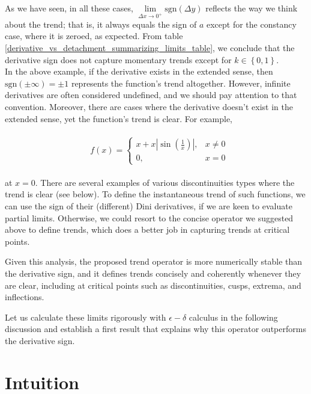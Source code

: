 \documentclass[11pt]{book}
\begin{document}
As we have seen, in all these cases, $\underset{\Delta x\rightarrow0^{+}}{\lim}\text{sgn}\left(\Delta y\right)$ reflects the way we think about the trend; that is, it always equals the sign of $a$ except for the constancy case, where it is zeroed, as expected. From table \ref{derivative_vs_detachment_summarizing_limits_table}, we conclude that the derivative sign does not capture momentary trends except for $k\in \left\{0,1\right\}$. \\

In the above example, if the derivative exists in the extended sense, then $\text{sgn}\left(\pm \infty\right) = \pm 1$ represents the function’s trend altogether. However, infinite derivatives are often considered undefined, and we should pay attention to that convention. Moreover, there are cases where the derivative doesn’t exist in the extended sense, yet the function’s trend is clear. For example,

\begin{align}
&\begin{aligned} f\left(x\right)=\begin{cases}
x+x\left|\sin\left(\frac{1}{x}\right)\right|,  &x\neq0\\
0, &x=0
\end{cases}
\end{aligned}
\end{align}

at $x=0$.
There are several examples of various discontinuities types where the trend is clear (see below). To define the instantaneous trend of such functions, we can use the sign of their (different) Dini derivatives, if we are keen to evaluate partial limits. Otherwise, we could resort to the concise operator we suggested above to define trends, which does a better job in capturing trends at critical points. 

Given this analysis, the proposed trend operator is more numerically stable than the derivative sign, and it defines trends concisely and coherently whenever they are clear, including at critical points such as discontinuities, cusps, extrema, and inflections.

Let us calculate these limits rigorously with $\epsilon-\delta$ calculus in the following discussion and establish a first result that explains why this operator outperforms the derivative sign.

\section{Intuition}
\end{document}
